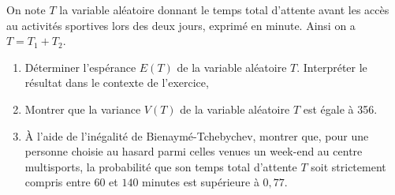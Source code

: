 \medskip

On note $T$ la variable aléatoire donnant le temps total d'attente avant les accès au activités sportives lors des deux jours, exprimé en minute. Ainsi on a $T = T_1 + T_2$.

\medskip

\begin{enumerate}
\item Déterminer l'espérance $E(T)$ de la variable aléatoire $T$. Interpréter le résultat dans le contexte de l'exercice,
\item Montrer que la variance $V(T)$ de la variable aléatoire $T$ est égale à 356.
\item À l'aide de l'inégalité de Bienaymé-Tchebychev, montrer que, pour une personne
choisie au hasard parmi celles venues un week-end au centre multisports, la probabilité que son temps total d'attente $T$ soit strictement compris entre $60$ et $140$ minutes est supérieure à $0,77$.
\end{enumerate}

\bigskip
